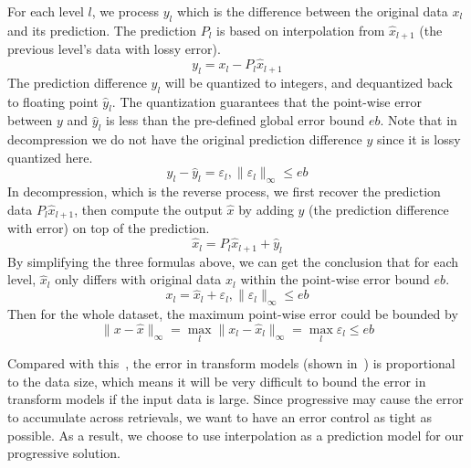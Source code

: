 For each level $l$, we process $y_l$ which is the difference between the original data $x_l$ and its prediction. The prediction $P_l$ is based on interpolation from $\hat{x}_{l+1}$ (the previous level's data with lossy error).
\[
y_l = x_l - P_l\hat{x}_{l+1}
\]
The prediction difference $y_l$ will be quantized to integers, and dequantized back to floating point $\hat y_l$. The quantization guarantees that the point-wise error between $y$ and $\hat y_l$ is less than the pre-defined global error bound $eb$. Note that in decompression we do not have the original prediction difference $y$ since it is lossy quantized here.
\[
y_l - \hat y_l = \varepsilon_l,\|\varepsilon_l\|_\infty \leq eb
\]
In decompression, which is the reverse process, we first recover the prediction data $P_l\hat{x}_{l+1}$, then compute the output $\hat{x}$ by adding $\hat y$ (the prediction difference with error) on top of the prediction. 
\[
\hat{x}_l = P_l\hat{x}_{l+1} + \hat{y}_l
\]
By simplifying the three formulas above, we can get the conclusion that for each level, $\hat x_l$ only differs with original data $x_l$ within the point-wise error bound $eb$.
\[
x_l = \hat{x}_l + \varepsilon_l, \|\varepsilon_l\|_\infty \leq eb
\]
Then for the whole dataset, the maximum point-wise error could be bounded by 
\begin{equation}
    \|x-\hat x\|_\infty = \max_l\|x_l -\hat x_l\|_\infty = \max_l \varepsilon_l \leq eb
\label{eq:error-prediction-interp}
\end{equation}

Compared with this~, the error in transform models (shown in~) is proportional to the data size, which means it will be very difficult to bound the error in transform models if the input data is large. Since progressive may cause the error to accumulate across retrievals, we want to have an error control as tight as possible. As a result, we choose to use interpolation as a prediction model for our progressive solution.

